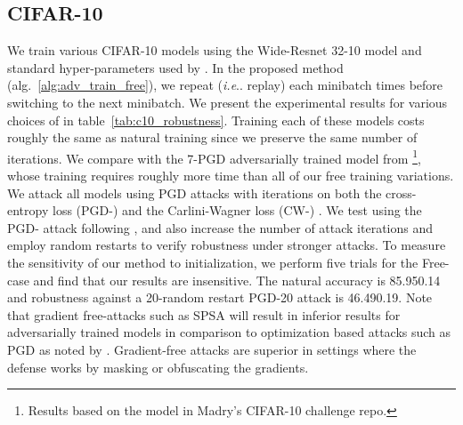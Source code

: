 \documentclass{article}
\makeatletter
\DeclareRobustCommand\onedot{\futurelet\@let@token\@onedot}
\def\@onedot{\ifx\@let@token.\else.\null\fi\xspace}
\def\ie{\emph{i.e}\onedot} \def\Ie{\emph{I.e}\onedot}
\makeatother
\begin{document}
\subsection*{CIFAR-10}
We train various CIFAR-10 models using the Wide-Resnet 32-10 model and standard hyper-parameters used by \cite{madry2017towards}. 
In the proposed method (alg.~\ref{alg:adv_train_free}), we repeat (\ie replay) each minibatch  times before switching to the next minibatch. We present the experimental results for various choices of  in table~\ref{tab:c10_robustness}. Training each of these models costs roughly the same as natural training since we preserve the same number of iterations.
We compare with the 7-PGD adversarially trained model from \cite{madry2017towards} \footnote{Results based on the  model in Madry's CIFAR-10 challenge repo.}, whose training requires roughly  more time than all of our free training variations.
We attack all models using PGD attacks with  iterations on both the cross-entropy loss (PGD-) and the Carlini-Wagner loss (CW-) \citep{carlini2017towards}. 
We test using the PGD- attack following \cite{madry2017towards}, and also increase the number of attack iterations and employ random restarts to verify robustness under stronger attacks. 
To measure the sensitivity of our method to initialization, we perform five trials for the Free- case and find that our results are insensitive. The natural accuracy is  85.950.14 and robustness against a 20-random restart PGD-20 attack is 46.490.19. 
Note that gradient free-attacks such as SPSA 
will result in inferior results for adversarially trained models in comparison to optimization based attacks such as PGD as noted by \cite{uesato2018adversarial}. Gradient-free attacks are superior in settings where the defense works by masking or obfuscating the gradients.
\end{document}
